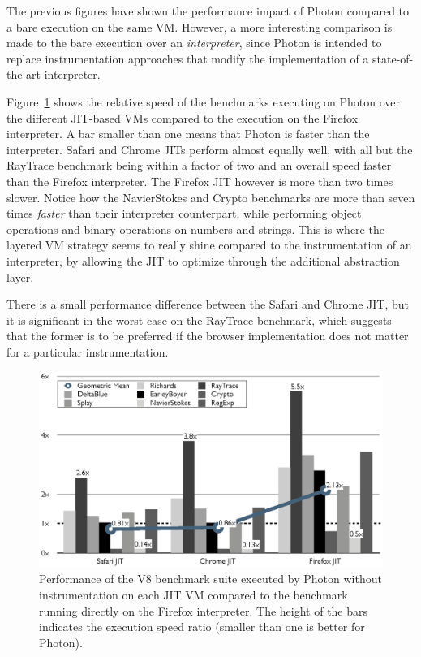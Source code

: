 The previous figures have shown the performance impact of Photon compared to a
bare execution on the same VM. However, a more interesting comparison is made
to the bare execution over an \textit{interpreter}, since Photon is intended to
replace instrumentation approaches that modify the implementation of a
state-of-the-art interpreter.

Figure~\ref{fig:perf-no-instrumentation-photon-vs-interpreter} shows the
relative speed of the benchmarks executing on Photon over the different
JIT-based VMs compared to the execution on the Firefox interpreter. A bar
smaller than one means that Photon is faster than the interpreter. Safari and
Chrome JITs perform almost equally well, with all but the RayTrace benchmark
being within a factor of two and an overall speed faster than the Firefox
interpreter. The Firefox JIT however is more than two times slower. Notice how
the NavierStokes and Crypto benchmarks are more than seven times \textit{faster}
than their interpreter counterpart, while performing object operations and
binary operations on numbers and strings. This is where the layered VM strategy
seems to really shine compared to the instrumentation of an interpreter, by
allowing the JIT to optimize through the additional abstraction layer.

There is a small performance difference between the Safari and Chrome JIT, but
it is significant in the worst case on the RayTrace benchmark, which suggests
that the former is to be preferred if the browser implementation does not
matter for a particular instrumentation.



\begin{figure}[htbp]
\begin{center}
\includegraphics[width=.85\textwidth]{figures/ComparisonToInterpreter}
\caption[Performance of the V8 benchmark suite executed by Photon without instrumentation]{Performance of the V8 benchmark suite executed by Photon without instrumentation
on each JIT VM compared to the benchmark running directly on the Firefox interpreter.  The height of the bars
indicates the execution speed ratio (smaller than one is better for Photon).}
\label{fig:perf-no-instrumentation-photon-vs-interpreter}
\end{center}
\end{figure}

